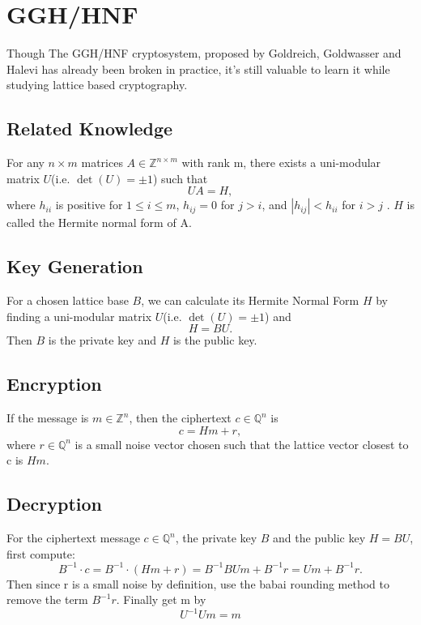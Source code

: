\section{GGH/HNF \cite{JL}}
Though The GGH/HNF cryptosystem, proposed by Goldreich, Goldwasser and Halevi has already been broken in practice, it's still valuable to learn it while studying lattice based cryptography.

\subsection{Related Knowledge}
For any $n \times m$ matrices $A \in \mathbb{Z}^{n \times m}$ with rank m, there exists a uni-modular matrix $U$(i.e. $\det(U)=\pm1$) such that 
$$
UA = H, 
$$
where $h_{ii}$ is positive for $1\leq i\leq m$, $h_{ij}=0$ for $j>i$, and $\left|h_{ij}\right|<h_{ii}$ for $i>j$  \cite{MSKNA}. $H$ is called the Hermite normal form  of A.

\subsection{Key Generation}
For a chosen lattice base $B$, we can calculate its Hermite Normal Form $H$ by finding a uni-modular matrix $U$(i.e. $\det(U)=\pm1$) and 
$$H=BU.$$
Then $B$ is the private key and $H$ is the public key.


\subsection{Encryption}
If the message is $m \in \mathbb{Z}^n$, then the ciphertext $c \in \mathbb{Q}^n$ is 
$$
c=Hm+r,
$$
where $r \in \mathbb{Q}^n $ is a small noise vector chosen such that the lattice vector closest to c is $Hm$.


\subsection{Decryption}
For the ciphertext message $c \in \mathbb{Q}^n$, the private key $B$ and the public key $H=BU$, first compute:
$$
B^{-1} \cdot c =B^{-1} \cdot (Hm + r) = B^{-1}BUm + B^{-1}r = Um + B^{-1}r.
$$
Then since r is a small noise by definition, use the babai rounding method\cite{BL}  to remove the term $B^{-1}r$. Finally get m by $$U^{-1}Um=m$$